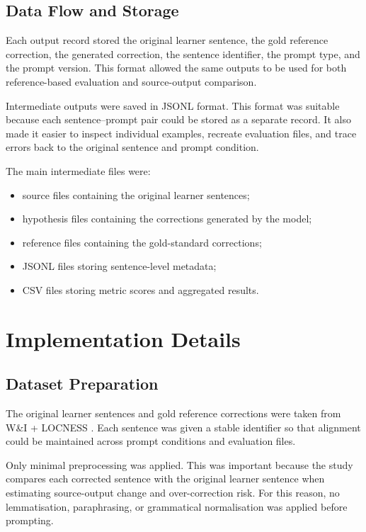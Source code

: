 \subsection{Data Flow and Storage}

Each output record stored the original learner sentence, the gold reference correction, the generated correction, the sentence identifier, the prompt type, and the prompt version. This format allowed the same outputs to be used for both reference-based evaluation and source-output comparison.

Intermediate outputs were saved in JSONL format. This format was suitable because each sentence--prompt pair could be stored as a separate record. It also made it easier to inspect individual examples, recreate evaluation files, and trace errors back to the original sentence and prompt condition.

The main intermediate files were:

\begin{itemize}
    \item source files containing the original learner sentences;
    \item hypothesis files containing the corrections generated by the model;
    \item reference files containing the gold-standard corrections;
    \item JSONL files storing sentence-level metadata;
    \item CSV files storing metric scores and aggregated results.
\end{itemize}

\section{Implementation Details}

\subsection{Dataset Preparation}

The original learner sentences and gold reference corrections were taken from W\&I + LOCNESS \cite{bryant-etal-2019-bea}. Each sentence was given a stable identifier so that alignment could be maintained across prompt conditions and evaluation files.

Only minimal preprocessing was applied. This was important because the study compares each corrected sentence with the original learner sentence when estimating source-output change and over-correction risk. For this reason, no lemmatisation, paraphrasing, or grammatical normalisation was applied before prompting.

